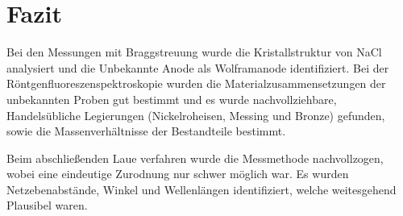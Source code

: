\chapter{Fazit}

Bei den Messungen mit Braggstreuung wurde die Kristallstruktur von NaCl analysiert und die Unbekannte Anode als Wolframanode identifiziert.
Bei der Röntgenfluoreszenspektroskopie wurden die Materialzusammensetzungen der unbekannten Proben gut bestimmt und es wurde nachvollziehbare, Handelsübliche Legierungen (Nickelroheisen, Messing und Bronze) gefunden, sowie die Massenverhältnisse der Bestandteile bestimmt.

Beim abschließenden Laue verfahren wurde die Messmethode nachvollzogen, wobei eine eindeutige Zurodnung nur schwer möglich war. Es wurden Netzebenabstände, Winkel und Wellenlängen identifiziert, welche weitesgehend Plausibel waren.
